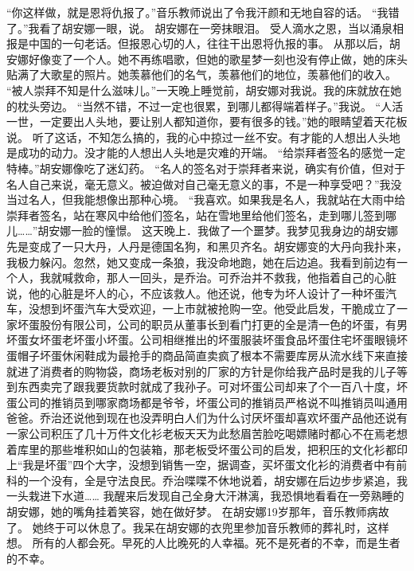 \documentclass[a4paper,12pt,UTF8,twoside]{ctexbook}
\begin{document}
        “你这样做，就是恩将仇报了。”音乐教师说出了令我汗颜和无地自容的话。 
        “我错了。”我看了胡安娜一眼，说。 
        胡安娜在一旁抹眼泪。 
        受人滴水之恩，当以涌泉相报是中国的一句老话。但报恩心切的人，往往干出恩将仇报的事。 
        从那以后，胡安娜好像变了一个人。她不再练唱歌，但她的歌星梦一刻也没有停止做，她的床头贴满了大歌星的照片。她羡慕他们的名气，羡慕他们的地位，羡慕他们的收入。 
        “被人崇拜不知是什么滋味儿。”一天晚上睡觉前，胡安娜对我说。我的床就放在她的枕头旁边。 
        “当然不错，不过一定也很累，到哪儿都得端着样子。”我说。 
        “人活一世，一定要出人头地，要让别人都知道你，要有很多的钱。”她的眼睛望着天花板说。 
        听了这话，不知怎么搞的，我的心中掠过一丝不安。有才能的人想出人头地是成功的动力。没才能的人想出人头地是灾难的开端。 
        “给崇拜者签名的感觉一定特棒。”胡安娜像吃了迷幻药。 
        “名人的签名对于崇拜者来说，确实有价值，但对于名人自己来说，毫无意义。被迫做对自己毫无意义的事，不是一种享受吧？”我没当过名人，但我能想像出那种心境。 
        “我喜欢。如果我是名人，我就站在大雨中给崇拜者签名，站在寒风中给他们签名，站在雪地里给他们签名，走到哪儿签到哪儿……”胡安娜一脸的憧憬。 
        这天晚上．我做了一个噩梦。我梦见我身边的胡安娜先是变成了一只大丹，人丹是德国名狗，和黑贝齐名。胡安娜变的大丹向我扑来，我极力躲闪。忽然，她又变成一条狼，我没命地跑，她在后边追。我看到前边有一个人，我就喊救命，那人一回头，是乔治。可乔治并不救我，他指着自己的心脏说，他的心脏是坏人的心，不应该救人。他还说，他专为坏人设计了一种坏蛋汽车，没想到坏蛋汽车大受欢迎，一上市就被抢购一空。他受此启发，干脆成立了一家坏蛋股份有限公司，公司的职员从董事长到看门打更的全是清一色的坏蛋，有男坏蛋女坏蛋老坏蛋小坏蛋。公司相继推出的坏蛋服装坏蛋食品坏蛋住宅坏蛋眼镜坏蛋帽子坏蛋休闲鞋成为最抢手的商品简直卖疯了根本不需要库房从流水线下来直接就进了消费者的购物袋，商场老板对别的厂家的方针是你给我产品时是我的儿子等到东西卖完了跟我要货款时就成了我孙子。可对坏蛋公司却来了个一百八十度，坏蛋公司的推销员到哪家商场都是爷爷，坏蛋公司的推销员严格说不叫推销员叫通用爸爸。乔治还说他到现在也没弄明白人们为什么讨厌坏蛋却喜欢坏蛋产品他还说有一家公司积压了几十万件文化衫老板天天为此愁眉苦脸吃喝嫖赌时都心不在焉老想着库里的那些堆积如山的包装箱，那老板受坏蛋公司的启发，把积压的文化衫都印上“我是坏蛋”四个大字，没想到销售一空，据调查，买坏蛋文化衫的消费者中有前科的一个没有，全是守法良民。乔治喋喋不休地说着，胡安娜在后边步步紧追，我一头栽进下水道…… 
        我醒来后发现自己全身大汗淋漓，我恐惧地看看在一旁熟睡的胡安娜，她的嘴角挂着笑容，她在做好梦。 
        在胡安娜19岁那年，音乐教师病故了。 
        她终于可以休息了。我呆在胡安娜的衣兜里参加音乐教师的葬礼时，这样想。 
        所有的人都会死。早死的人比晚死的人幸福。死不是死者的不幸，而是生者的不幸。 
\end{document}
